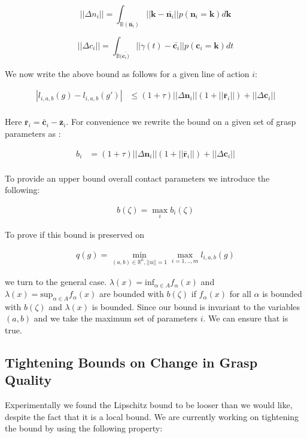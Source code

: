 \documentclass[letterpaper, 10 pt, conference]{ieeeconf}  %
\begin{document}
\[
  ||\Delta n_i|| =  \int_{\mathbb{B}(\bar{\textbf{n}_i})} ||\textbf{k} - \bar{\textbf{n}_i}|| p(\textbf{n}_i = \textbf{k}) d\textbf{k}
\]

\[
  ||\Delta c_i|| =  \int_{\mathbb{B}(\bar{\textbf{c}_i)}} ||\gamma(t) - \bar{\textbf{c}_i}|| p(\textbf{c}_i = \textbf{k}) dt
\]

We now write the above bound as follows for a given line of action $i$: 

 \begin{align*}
|l_{i,a,b}(g) - l_{i,a,b}(g')| & \leq (1+\tau)||\Delta \textbf{n}_{i}||(1+||\bar{\textbf{r}}_i||) + ||\Delta{\textbf{c}_{i}}|| \\
  \end{align*}

Here $\bar{\textbf{r}}_i = \bar{\textbf{c}}_i - \bar{\textbf{z}}_i$. For convenience we rewrite the bound on a given set of grasp parameters as : 

 \begin{align*}
b_i &= (1+\tau)||\Delta \textbf{n}_{i}||(1+||\bar{\textbf{r}}_i||) + ||\Delta{\textbf{c}_{i}}|| \\
\end{align*}

To provide an upper bound overall contact parameters we introduce the following: 

\begin{align}
b(\zeta)  = \max_{i} b_i(\zeta)
\end{align}

To prove if  this bound is preserved on

 \begin{align}
 q(g) = \min_{(a,b) \in \mathbb{R}^6, ||u||=1} \max_{i=1,..,m} l_{i,a,b}(g)
 \end{align}
 
we turn to the general case.
$\lambda(x) = \mbox{inf}_{\alpha \in A} f_\alpha(x)$ and $\lambda(x) = \mbox{sup}_{\alpha \in A} f_\alpha(x)$ are bounded with $b(\zeta)$ if $f_\alpha(x)$ for all $\alpha$ is bounded with $b(\zeta)$ and $\lambda(x)$ is bounded.
Since our bound is invariant to the variables $(a,b)$ and we take the maximum set of parameters $i$.
We can ensure that is true.


\subsection{Tightening Bounds on Change in Grasp Quality}

Experimentally we found the Lipschitz bound to be looser than we would like, despite the fact that it is a local bound. We are currently working on tightening the bound by using the following property: 
\end{document}
